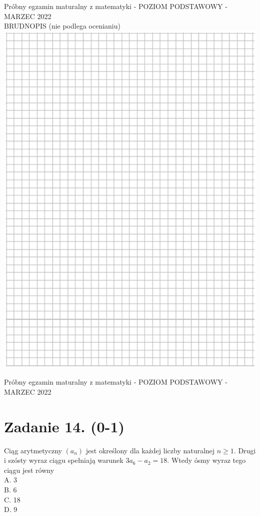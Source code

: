 \documentclass[10pt]{article}
\begin{document}
Próbny egzamin maturalny z matematyki - POZIOM PODSTAWOWY - MARZEC 2022\\
BRUDNOPIS (nie podlega ocenianiu)\\
\includegraphics[max width=\textwidth, center]{2024_11_21_fd555512e32c497e8a5dg-07}

Próbny egzamin maturalny z matematyki - POZIOM PODSTAWOWY - MARZEC 2022

\section*{Zadanie 14. (0-1)}
Ciąg arytmetyczny \(\left(a_{n}\right)\) jest określony dla każdej liczby naturalnej \(n \geq 1\). Drugi i szósty wyraz ciągu spełniają warunek \(3 a_{6}-a_{2}=18\). Wtedy ósmy wyraz tego ciągu jest równy\\
A. 3\\
B. 6\\
C. 18\\
D. 9
\end{document}
